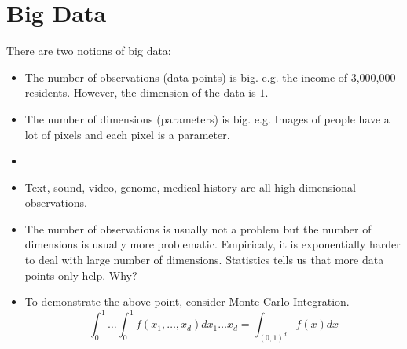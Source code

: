 \documentclass[../main]{subfiles}
\begin{document}
\section{Big Data}
There are two notions of big data: \begin{itemize}
  \item The number of observations (data points) is big. e.g. the income of 3,000,000 residents. However, the dimension of the data is $1$.
  \item The number of dimensions (parameters) is big. e.g. Images of people have a lot of pixels and each pixel is a parameter.
  \item \item Text, sound, video, genome, medical history are all high dimensional observations.
\end{itemize}

\begin{itemize}
  \item The number of observations is usually not a problem but the number of dimensions is usually more problematic. Empiricaly, it is exponentially harder to deal with large number of dimensions.
  Statistics tells us that more data points only help. Why?
  \item To demonstrate the above point, consider Monte-Carlo Integration. 
  \[
    \int_{0}^1\dots \int_0^1 f(x_1,\dots,x_d)dx_1\dots x_d = \int_{(0,1)^d}f(x)dx
  \]
\end{itemize}
\end{document}

